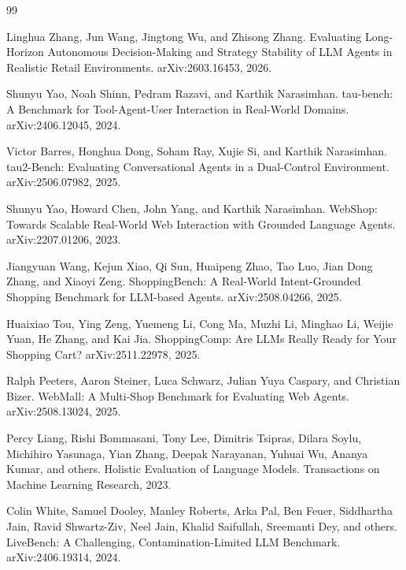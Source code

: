 \documentclass[11pt]{article}
\begin{document}
\begin{thebibliography}{99}

Linghua Zhang, Jun Wang, Jingtong Wu, and Zhisong Zhang.
\newblock Evaluating Long-Horizon Autonomous Decision-Making and Strategy Stability of LLM Agents in Realistic Retail Environments.
\newblock arXiv:2603.16453, 2026.

Shunyu Yao, Noah Shinn, Pedram Razavi, and Karthik Narasimhan.
\newblock tau-bench: A Benchmark for Tool-Agent-User Interaction in Real-World Domains.
\newblock arXiv:2406.12045, 2024.

Victor Barres, Honghua Dong, Soham Ray, Xujie Si, and Karthik Narasimhan.
\newblock tau2-Bench: Evaluating Conversational Agents in a Dual-Control Environment.
\newblock arXiv:2506.07982, 2025.

Shunyu Yao, Howard Chen, John Yang, and Karthik Narasimhan.
\newblock WebShop: Towards Scalable Real-World Web Interaction with Grounded Language Agents.
\newblock arXiv:2207.01206, 2023.

Jiangyuan Wang, Kejun Xiao, Qi Sun, Huaipeng Zhao, Tao Luo, Jian Dong Zhang, and Xiaoyi Zeng.
\newblock ShoppingBench: A Real-World Intent-Grounded Shopping Benchmark for LLM-based Agents.
\newblock arXiv:2508.04266, 2025.

Huaixiao Tou, Ying Zeng, Yuemeng Li, Cong Ma, Muzhi Li, Minghao Li, Weijie Yuan, He Zhang, and Kai Jia.
\newblock ShoppingComp: Are LLMs Really Ready for Your Shopping Cart?
\newblock arXiv:2511.22978, 2025.

Ralph Peeters, Aaron Steiner, Luca Schwarz, Julian Yuya Caspary, and Christian Bizer.
\newblock WebMall: A Multi-Shop Benchmark for Evaluating Web Agents.
\newblock arXiv:2508.13024, 2025.

Percy Liang, Rishi Bommasani, Tony Lee, Dimitris Tsipras, Dilara Soylu, Michihiro Yasunaga, Yian Zhang, Deepak Narayanan, Yuhuai Wu, Ananya Kumar, and others.
\newblock Holistic Evaluation of Language Models.
\newblock Transactions on Machine Learning Research, 2023.

Colin White, Samuel Dooley, Manley Roberts, Arka Pal, Ben Feuer, Siddhartha Jain, Ravid Shwartz-Ziv, Neel Jain, Khalid Saifullah, Sreemanti Dey, and others.
\newblock LiveBench: A Challenging, Contamination-Limited LLM Benchmark.
\newblock arXiv:2406.19314, 2024.


\end{thebibliography}
\end{document}
